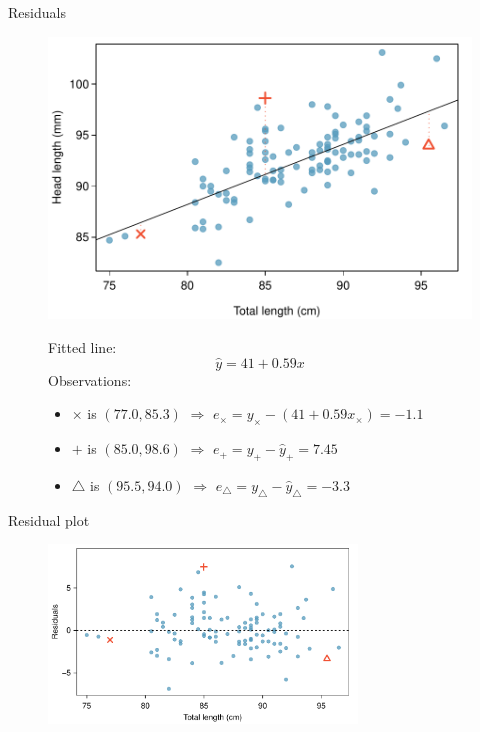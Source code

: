 \documentclass[12pt,a4paper]{beamer}
\begin{document}
	\begin{frame}{Residuals}
		\begin{figure}
		   	\centering
			\begin{minipage}{.5\textwidth}
			  \centering
		   \includegraphics[width=\textwidth]{figures/scattHeadLTotalLLine/scattHeadLTotalLLine}
		   
	\end{minipage}%
	\begin{minipage}{0.4\textwidth}
	\small	Fitted line:
		\[\hat{y}=41+0.59x\]
		Observations:
\small
		\begin{itemize}
			\item $\times$ is $(77.0, 85.3)$ $\Rightarrow$ $e_{\times}=y_{\times}-(41+0.59x_{\times})=-1.1$
			\item $+$ is 	$(85.0, 98.6)$ $\Rightarrow$ $e_{+}=y_{+}-\hat{y}_{+}=7.45$
			\item $\triangle$ is  $(95.5, 94.0)$ $\Rightarrow$ $e_{\triangle}=y_{\triangle}-\hat{y}_{\triangle}=-3.3$
		\end{itemize}
	\end{minipage}
				\end{figure}
		\end{frame}
\begin{frame}{Residual plot}
	
	\begin{figure}
	   \centering
	   \includegraphics[width=0.73\textwidth]{figures/scattHeadLTotalLResidualPlot/scattHeadLTotalLResidualPlot}
	   
	\end{figure}
\end{frame}
\end{document}
